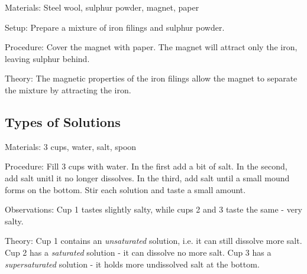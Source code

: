 \begin{multicols}{2}
\begin{description*}
\item[Materials:]{Steel wool, sulphur powder, magnet, paper}
\item[Setup:]{Prepare a mixture of iron filings and sulphur powder.}
\item[Procedure:]{Cover the magnet with paper.
The magnet will attract only the
iron, leaving sulphur behind.}
\item[Theory:]{The magnetic properties of the iron filings allow the magnet to separate the mixture by attracting the iron.}
\end{description*}

\subsection{Types of Solutions} %


\begin{description*}
\item[Materials:]{3 cups, water, salt, spoon}
\item[Procedure:]{Fill 3 cups with water. In the first add a bit of salt. In the second, add salt unitl it no longer dissolves. In the third, add salt until a small mound forms on the bottom. Stir each solution and taste a small amount.}
\item[Observations:]{Cup 1 tastes slightly salty, while cups 2 and 3 taste the same - very salty.}
\item[Theory:]{Cup 1 contains an \emph{unsaturated} solution, i.e. it can still dissolve more salt. Cup 2 has a \emph{saturated} solution - it can dissolve no more salt. Cup 3 has a \emph{supersaturated} solution - it holds more undissolved salt at the bottom.}
\end{description*}


\end{multicols}
